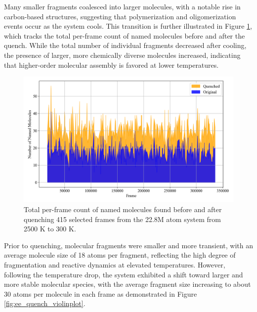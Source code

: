 Many smaller fragments coalesced into larger molecules, with a notable rise in carbon-based structures, suggesting that polymerization and oligomerization events occur as the system cools.
This transition is further illustrated in Figure \ref{fig:ee_quench_lineplot}, which tracks the total per-frame count of named molecules before and after the quench. While the total number of individual fragments decreased after cooling, the presence of larger, more chemically diverse molecules increased, indicating that higher-order molecular assembly is favored at lower temperatures.

\begin{figure}[!h]
    \centering
    \includegraphics[width=1\linewidth]{Images/early_earth/mol_counts-before-after-quench.png}
    \caption[Line plot: total named molecules found before and after quenching system]{Total per-frame count of named molecules found before and after quenching 415 selected frames from the 22.8M atom system from 2500 K to 300 K.}
    \label{fig:ee_quench_lineplot}
\end{figure}

Prior to quenching, molecular fragments were smaller and more transient, with an average molecule size of 18 atoms per fragment, reflecting the high degree of fragmentation and reactive dynamics at elevated temperatures. However, following the temperature drop, the system exhibited a shift toward larger and more stable molecular species, with the average fragment size increasing to about 30 atoms per molecule in each frame as demonstrated in Figure \ref{fig:ee_quench_violinplot}.

